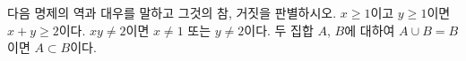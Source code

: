 다음 명제의 역과 대우를 말하고 그것의 참, 거짓을 판별하시오. 
 $x\ge 1$이고 $y\ge 1$이면 $x+y\ge 2$이다.
 $xy\ne 2$이면 $x\ne 1$ 또는 $y\ne 2$이다.
 두 집합 $A$, $B$에 대하여 $A\cup B=B$이면 $A\subset B$이다.
